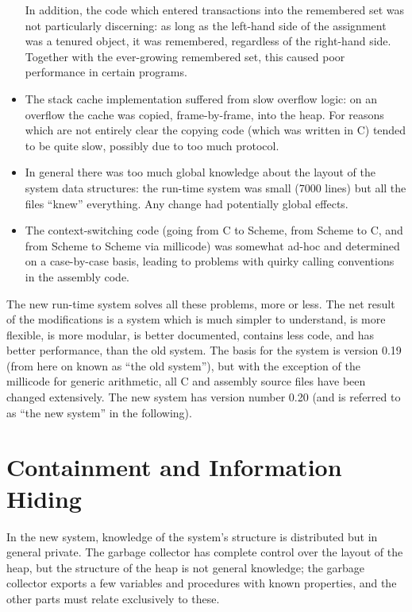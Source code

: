 \begin{itemize}
In addition, the code which entered transactions into the remembered set was
not particularly discerning: as long as the left-hand side of the assignment
was a tenured object, it was remembered, regardless of the right-hand side.
Together with the ever-growing remembered set, this caused poor performance
in certain programs.

\item
The stack cache implementation suffered from slow overflow logic: on an
overflow the cache was copied, frame-by-frame, into the heap. For reasons
which are not entirely clear the copying code (which was written in C)
tended to be quite slow, possibly due to too much protocol.

\item
In general there was too much global knowledge about the layout of the system
data structures: the run-time system was small (7000 lines) but all the files
``knew'' everything. Any change had potentially global effects.

\item
The context-switching code (going from C to Scheme, from Scheme to C, and
from Scheme to Scheme via millicode) was somewhat ad-hoc and determined
on a case-by-case basis, leading to problems with quirky calling conventions
in the assembly code.

\end{itemize}

The new run-time system solves all these problems, more or less. The net
result of the modifications is a system which is much simpler to understand,
is more flexible, is more modular, is better documented, contains less code,
and has better performance, than the old system. The basis for the system is
version 0.19 (from here on known as ``the old system''), but with the
exception of the millicode for generic arithmetic, all C and assembly source
files have been changed extensively.  The new system has version number 0.20
(and is referred to as ``the new system'' in the following).

\section{Containment and Information Hiding}

In the new system, knowledge of the system's structure is distributed but in
general private. The garbage collector has complete control over the layout
of the heap, but the structure of the heap is not general knowledge; the
garbage collector exports a few variables and procedures with known
properties, and the other parts must relate exclusively to these.

